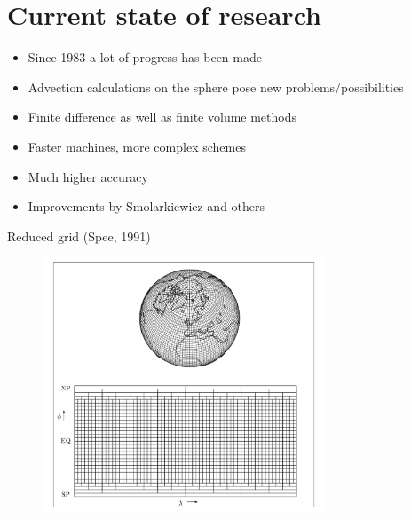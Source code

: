 \documentclass[hyperref={pdfstartview=Fit}]{beamer}
\newcommand{\imsize}{}
\begin{document}
\section{Current state of research}
\begin{frame}
\begin{itemize}
\item Since 1983 a lot of progress has been made
\item Advection calculations on the sphere pose new problems/possibilities
\item Finite difference as well as finite volume methods 
\item Faster machines, more complex schemes
\item Much higher accuracy
\item Improvements by Smolarkiewicz and others
\end{itemize}
\end{frame}

\begin{frame}
Reduced grid (Spee, 1991)
\begin{figure}
\renewcommand{\imsize}{0.75\textwidth}
\includegraphics[width=\imsize]{globe}%
\end{figure}
\end{frame}
\end{document}
